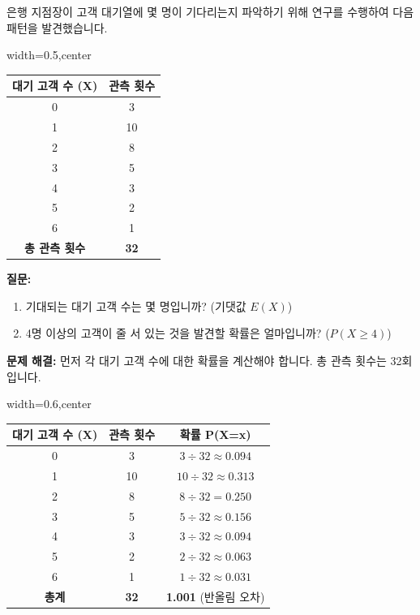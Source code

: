 \documentclass[11pt,a4paper]{book}
\theoremstyle{definition}
\begin{document}
\begin{examplebox}[title={연습 문제: 은행 대기 고객 수}]
은행 지점장이 고객 대기열에 몇 명이 기다리는지 파악하기 위해 연구를 수행하여 다음 패턴을 발견했습니다.

\begin{adjustbox}{width=0.5\textwidth,center}
\begin{tabular}{cc}
\toprule
\textbf{대기 고객 수 (X)} & \textbf{관측 횟수} \\
\midrule
0 & 3 \\
1 & 10 \\
2 & 8 \\
3 & 5 \\
4 & 3 \\
5 & 2 \\
6 & 1 \\
\midrule
\textbf{총 관측 횟수} & \textbf{32} \\
\bottomrule
\end{tabular}
\end{adjustbox}

\textbf{질문:}
\begin{enumerate}
    \item 기대되는 대기 고객 수는 몇 명입니까? (기댓값 \(E(X)\))
    \item 4명 이상의 고객이 줄 서 있는 것을 발견할 확률은 얼마입니까? (\(P(X \ge 4)\))
\end{enumerate}

\textbf{문제 해결:}
먼저 각 대기 고객 수에 대한 확률을 계산해야 합니다. 총 관측 횟수는 32회입니다.

\begin{adjustbox}{width=0.6\textwidth,center}
\begin{tabular}{ccc}
\toprule
\textbf{대기 고객 수 (X)} & \textbf{관측 횟수} & \textbf{확률 P(X=x)} \\
\midrule
0 & 3 & \(3 \div 32 \approx 0.094\) \\
1 & 10 & \(10 \div 32 \approx 0.313\) \\
2 & 8 & \(8 \div 32 = 0.250\) \\
3 & 5 & \(5 \div 32 \approx 0.156\) \\
4 & 3 & \(3 \div 32 \approx 0.094\) \\
5 & 2 & \(2 \div 32 \approx 0.063\) \\
6 & 1 & \(1 \div 32 \approx 0.031\) \\
\midrule
\textbf{총계} & \textbf{32} & \textbf{1.001} (반올림 오차) \\
\bottomrule
\end{tabular}
\end{adjustbox}


\end{examplebox}
\end{document}
